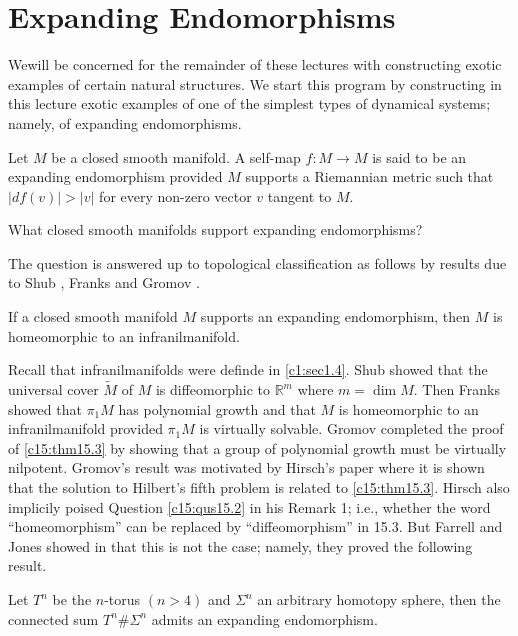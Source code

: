 \chapter{Expanding Endomorphisms}\label{c15}

We\pageoriginale will be concerned for the remainder of these lectures with
constructing exotic examples of certain natural structures. We start
this program by constructing in this lecture exotic examples of one of
the simplest types of dynamical systems; namely, of expanding
endomorphisms.

\begin{defi}\label{c15:defi15.1}
  Let $M$ be a closed smooth manifold. A self-map $f: M \to M$ is said
  to be an expanding endomorphism provided $M$ supports a Riemannian
  metric such that $|df (v)|> |v|$ for every non-zero vector $v$
  tangent to $M$.
\end{defi}

\begin{qus}\label{c15:qus15.2}
  What closed smooth manifolds support expanding endomorphisms?
\end{qus}

The question is answered up to topological classification as follows
by results due to Shub \cite{89}, Franks \cite{52} and Gromov
\cite{53}. 

\begin{thm}\label{c15:thm15.3}
  If a closed smooth manifold $M$ supports an expanding endomorphism,
  then $M$ is homeomorphic to an infranilmanifold.
\end{thm}

Recall that infranilmanifolds were definde in \ref{c1:sec1.4}. Shub
showed that the universal cover $\tilde{M}$ of $M$ is diffeomorphic to
$\mathbb{R}^m$ where $m= \dim M$. Then Franks showed that $\pi_1 M$ has
polynomial growth and that $M$ is homeomorphic to an infranilmanifold
provided $\pi_1 M$ is virtually solvable. Gromov completed the proof
of \ref{c15:thm15.3} by showing that a group of polynomial growth must
be virtually nilpotent. Gromov's result was motivated by Hirsch's
paper \cite{60} where it is shown that the solution to Hilbert's fifth
problem is related to \ref{c15:thm15.3}. Hirsch also implicily poised
Question \ref{c15:qus15.2} in his Remark 1; i.e., whether the word
``homeomorphism'' can be replaced by ``diffeomorphism'' in 15.3. But
Farrell and Jones showed in \cite{35} that this is not the case;
namely, they proved the following result.

\begin{thm}\label{c15:thm15.4}
  Let $T^n$ be the $n$-torus $(n > 4)$ and $\Sigma^n$ an arbitrary
  homotopy sphere, then the connected sum $T^n\# \Sigma^n$ admits an
  expanding endomorphism.
\end{thm}

